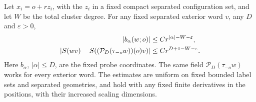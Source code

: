 \begin{proposition}
\label{ch18:mixed-bound}
Let $x_i=o+r z_i$, with the $z_i$ in a fixed compact separated
configuration set, and let $W$ be the total cluster degree.
For any fixed separated exterior word $v$, any $D$ and $\varepsilon>0$,
\begin{align}
 |b_\alpha(w;o)|&\le C r^{|\alpha|-W-\varepsilon},\notag\\
 |S(wv)-S((\mathcal P_D(\tau_{-o}w))(o)v)|
                   &\le C r^{D+1-W-\varepsilon}.
 \label{ch18:mixed-product-rate}
\end{align}
Here $b_\alpha$, $|\alpha|\le D$, are the fixed probe coordinates. The same field
$\mathcal P_D(\tau_{-o}w)$ works for every exterior word. The
estimates are uniform on fixed bounded label sets and separated
geometries, and hold with any fixed finite derivatives in the positions,
with their increased scaling dimensions.
\end{proposition}
